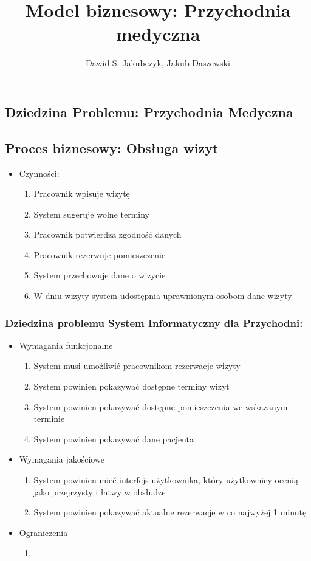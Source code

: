 \documentclass{article}
\author{Dawid S. Jakubczyk, Jakub Daszewski}
\title{Model biznesowy: Przychodnia medyczna}
\begin{document}
	\maketitle
	\subsection*{Dziedzina Problemu: Przychodnia Medyczna}
	\subsection*{Proces biznesowy: Obsługa wizyt}
	\begin{itemize}
		\item Czynności:
		\begin{enumerate}
			\item Pracownik wpisuje wizytę
			\item System sugeruje wolne terminy
			\item Pracownik potwierdza zgodność danych
			\item Pracownik rezerwuje pomieszczenie
			\item System przechowuje dane o wizycie
			\item W dniu wizyty system udostępnia uprawnionym osobom dane wizyty
		\end{enumerate}
	\end{itemize}
	\subsubsection*{Dziedzina problemu System Informatyczny dla Przychodni:}
	\begin{itemize}
		\item Wymagania funkcjonalne
		\begin{enumerate}
			\item System musi umożliwić pracownikom rezerwacje wizyty
			\item System powinien pokazywać dostępne terminy wizyt
			\item System powinien pokazywać dostępne pomieszczenia we wskazanym terminie
			\item System powinien pokazywać dane pacjenta
		\end{enumerate}
		\item Wymagania jakościowe
		\begin{enumerate}
			\item System powinien mieć interfejs użytkownika, który użytkownicy ocenią jako przejrzysty i łatwy w obsłudze
			\item System powinien pokazywać aktualne rezerwacje w co najwyżej 1 minutę
		\end{enumerate}
		\item Ograniczenia
		\begin{enumerate}
			\item
		\end{enumerate}
	\end{itemize}
	
\end{document}

